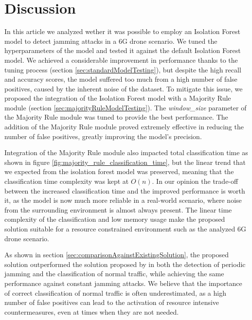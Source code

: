 \documentclass[futureinternet,article,submit,pdftex,moreauthors]{Definitions/mdpi}
\begin{document}
\section{Discussion}


In this article we analyzed wether it was possible to employ an Isolation Forest model to detect jamming attacks in a 6G drone scenario. We tuned the hyperparameters of the model and tested it against the default Isolation Forest model. 
We achieved a considerable improvement in performance thanks to the tuning process (section \ref{sec:standardModelTesting}), but despite the high recall and accuracy scores, the model suffered too much from a high number of false positives, caused by the inherent noise of the dataset. 
To mitigate this issue, we proposed the integration of the Isolation Forest model with a Majority Rule module (section \ref{sec:majorityRuleModelTesting}). The \textit{window\_size} parameter of the Majority Rule module was tuned to provide the best performance.
The addition of the Majority Rule module proved extremely effective in reducing the number of false positives, greatly improving the model's precision. 

Integration of the Majority Rule module also impacted total classification time as shown in figure \ref{fig:majority_rule_classification_time}, but the linear trend \cite{IsolationForestLiu} that we expected from the isolation forest model was preserved, meaning that the classification time complexity was kept at $O(n)$. 
In our opinion the trade-off between the increased classification time and the improved performance is worth it, as the model is now much more reliable in a real-world scenario, where noise from the surrounding environment is almost always present.
The linear time complexity of the classification and low memory usage make the proposed solution suitable for a resource constrained environment such as the analyzed 6G drone scenario.

As shown in section \ref{sec:comparisonAgainstExistingSolution}, the proposed solution outperformed the solution proposed by \cite{JammingDetectionIoT-Hussain} in both the detection of periodic jamming and the classification of normal traffic, while achieving the same performance against constant jamming attacks. 
We believe that the importance of correct classification of normal traffic is often underestimated, as a high number of false positives can lead to the activation of resource intensive countermeasures, even at times when they are not needed. 
\end{document}
